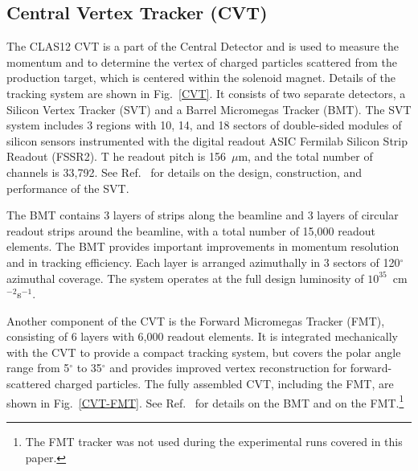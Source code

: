 \documentclass[final,3p,twocolumn]{elsarticle}
\begin{document}
\subsection{Central Vertex Tracker (CVT)}

The CLAS12 CVT is a part of the Central Detector and is used to measure the momentum and to determine the vertex
of charged particles scattered from the production target, which is centered within the solenoid magnet. Details of
the tracking system are shown in Fig.~\ref{CVT}. It consists of two separate detectors, a Silicon Vertex Tracker
(SVT) and a Barrel Micromegas Tracker  (BMT). The SVT system includes 3 regions with 10, 14, and 18 sectors of
double-sided modules of silicon sensors instrumented with the digital readout ASIC Fermilab Silicon Strip Readout (FSSR2). T
he readout pitch is
156~$\mu$m, and the total number of channels is 33,792. See Ref.~\cite{SVT} for details on the design,
construction, and performance of the SVT.

The BMT contains 3 layers of strips along the beamline and 3 layers of circular readout strips around the beamline,
with a total number of 15,000 readout elements. The BMT provides important improvements in momentum resolution
and in tracking efficiency. Each layer is arranged azimuthally in 3 sectors of 120$^\circ$ azimuthal coverage. The
system operates at the full design luminosity of $10^{35}$~cm$^{-2}$s$^{-1}$.

Another component of the CVT is the Forward Micromegas Tracker (FMT), consisting of 6 layers with 6,000 readout
elements. It  is integrated mechanically with the CVT to provide a compact tracking system, but covers the polar
angle range from 5$^\circ$ to 35$^\circ$ and provides improved vertex reconstruction for forward-scattered
charged particles. The fully assembled CVT, including the FMT, are shown in Fig.~\ref{CVT-FMT}.  See
Ref.~\cite{BMT} for details on the BMT and on the FMT.\footnote{The FMT tracker was not used
 during the experimental runs covered in this paper.}  
\end{document}
